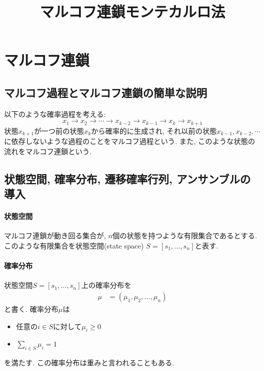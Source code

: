 





\title{マルコフ連鎖モンテカルロ法}
\maketitle

\section{マルコフ連鎖}
\subsection{マルコフ過程とマルコフ連鎖の簡単な説明}

以下のような確率過程を考える:
\begin{equation}
    x_{1} \to x_{2} \to \cdots \to x_{k-2} \to x_{k-1} \to x_{k} \to x_{k+1}
\end{equation}
状態$x_{k+1}$が一つ前の状態$x_{k}$から確率的に生成され, それ以前の状態$x_{k-1}, x_{k-2}, \cdots$に依存しないような過程のことをマルコフ過程という. また, このような状態の流れをマルコフ連鎖という. 

\subsection{状態空間, 確率分布, 遷移確率行列, アンサンブルの導入}
\paragraph{状態空間}
マルコフ連鎖が動き回る集合が, $n$個の状態を持つような有限集合であるとする.
このような有限集合を状態空間(state space) $S = [s_{1}, \ldots, s_{n}]$と表す.

\paragraph{確率分布}
状態空間$S = [s_{1}, \ldots, s_{n}]$上の確率分布を
\begin{align}
\mu &= (\mu_{1}, \mu_{2}, \ldots, \mu_{n})
\end{align}
と書く. 確率分布$\mu$は
\begin{itemize}
    \item 任意の$i \in S$に対して$\mu_{i} \ge 0$
    \item $\sum_{i \in S} \mu_{i} = 1$
\end{itemize}
を満たす.
この確率分布は重みと言われることもある.

